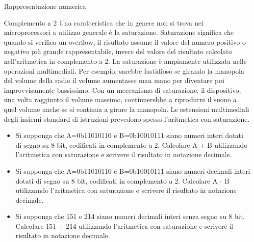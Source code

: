 \documentclass[11pt]{article}
\begin{document}
\begin{quiz}{Rappresentazione numerica}
\begin{cloze}[points=1,shuffle=false]{Complemento a 2}
Una caratteristica che in genere non si trova nei microprocessori a utilizzo generale è la saturazione. Saturazione significa che quando si
verifica un overflow, il risultato assume il valore del numero positivo o negativo più grande rappresentabile, invece del valore del risultato calcolato nell'aritmetica in complemento a 2. La saturazione è ampiamente utilizzata nelle operazioni multimediali. Per esempio, sarebbe fastidioso se girando la manopola del volume della radio il volume aumentasse man mano per diventare poi improvvisamente bassissimo. Con un meccanismo di saturazione, il dispositivo, una volta raggiunto il volume massimo, continuerebbe a riprodurre il suono a quel volume anche se si
continua a girare la manopola. Le estensioni multimediali degli insiemi standard di istruzioni prevedono spesso l'aritmetica con saturazione.

\begin{itemize}
\item Si supponga che A=0b11010110 e B=0b10010111 siano numeri interi dotati di segno su 8 bit, codificati in complemento a 2. Calcolare A + B utilizzando l'aritmetica con saturazione e scrivere il risultato in notazione decimale.
\item Si supponga che A=0b11010110 e B=0b10010111 siano numeri decimali interi dotati di segno su 8 bit, codificati in complemento a 2. Calcolare A - B utilizzando l'aritmetica con saturazione e scrivere il risultato in notazione decimale. 
\item Si supponga che 151 e 214 siano numeri decimali interi senza segno su 8 bit. Calcolare 151 + 214 utilizzando l'aritmetica con saturazione e scrivere il risultato in notazione decimale.
\end{itemize}
\end{cloze}

\end{quiz}
\end{document}
